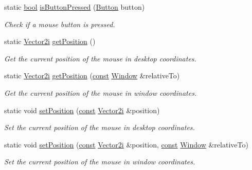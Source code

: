 \begin{DoxyCompactItemize}
\item 
static \hyperlink{term__entry_8h_a002004ba5d663f149f6c38064926abac}{bool} \hyperlink{classsf_1_1_mouse_ab647159eb88e369a0332a9c5a7ba6687}{is\-Button\-Pressed} (\hyperlink{classsf_1_1_mouse_a4fb128be433f9aafe66bc0c605daaa90}{Button} button)
\begin{DoxyCompactList}\small\item\em Check if a mouse button is pressed. \end{DoxyCompactList}\item 
static \hyperlink{namespacesf_a0eed58bf66694ebbc55f72ca7de840d9}{Vector2i} \hyperlink{classsf_1_1_mouse_ac368680f797b7f6e4f50b5b7928c1387}{get\-Position} ()
\begin{DoxyCompactList}\small\item\em Get the current position of the mouse in desktop coordinates. \end{DoxyCompactList}\item 
static \hyperlink{namespacesf_a0eed58bf66694ebbc55f72ca7de840d9}{Vector2i} \hyperlink{classsf_1_1_mouse_a93b4d2ebef728e77a0ec9d83c1e0b0c8}{get\-Position} (\hyperlink{term__entry_8h_a57bd63ce7f9a353488880e3de6692d5a}{const} \hyperlink{classsf_1_1_window}{Window} \&relative\-To)
\begin{DoxyCompactList}\small\item\em Get the current position of the mouse in window coordinates. \end{DoxyCompactList}\item 
static void \hyperlink{classsf_1_1_mouse_a1222e16c583be9e3d176d86e0b7817d7}{set\-Position} (\hyperlink{term__entry_8h_a57bd63ce7f9a353488880e3de6692d5a}{const} \hyperlink{namespacesf_a0eed58bf66694ebbc55f72ca7de840d9}{Vector2i} \&position)
\begin{DoxyCompactList}\small\item\em Set the current position of the mouse in desktop coordinates. \end{DoxyCompactList}\item 
static void \hyperlink{classsf_1_1_mouse_ad9b16ec7041531315f06b26b413dfea8}{set\-Position} (\hyperlink{term__entry_8h_a57bd63ce7f9a353488880e3de6692d5a}{const} \hyperlink{namespacesf_a0eed58bf66694ebbc55f72ca7de840d9}{Vector2i} \&position, \hyperlink{term__entry_8h_a57bd63ce7f9a353488880e3de6692d5a}{const} \hyperlink{classsf_1_1_window}{Window} \&relative\-To)
\begin{DoxyCompactList}\small\item\em Set the current position of the mouse in window coordinates. \end{DoxyCompactList}\item 

\end{DoxyCompactItemize}
